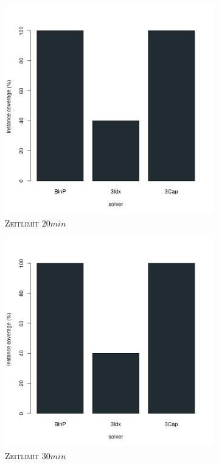 \begin{figure}[H]
\begin{subfigure}[b]{0.3\textwidth}
\includegraphics[width=1.2\textwidth]{img/solver_instance_coverage_b=3_m_1200s.png}
\caption{\textsc{Zeitlimit} $20min$}
\label{}
\end{subfigure}
\hfill
\begin{subfigure}[b]{0.3\textwidth}
\centering
\includegraphics[width=1.2\textwidth]{img/solver_instance_coverage_b=3_m_1800s.png}
\caption{\textsc{Zeitlimit} $30min$}
\label{}
\end{subfigure}

\caption{}
\label{fig:instance_coverage_b=3_s}
\end{figure}


